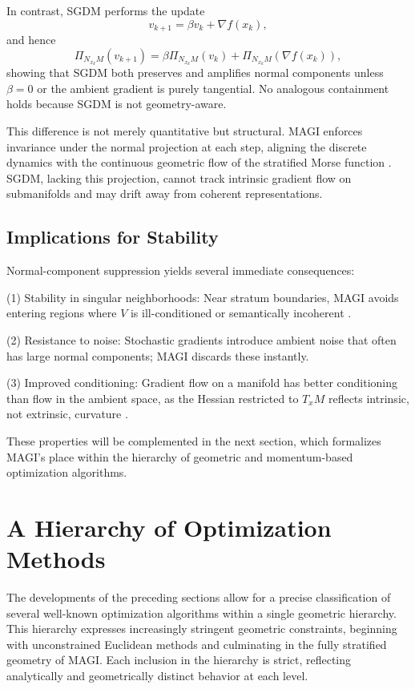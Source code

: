 \documentclass[12pt]{article}
\begin{document}
In contrast, SGDM performs the update
\[
v_{k+1}
=
\beta v_k + \nabla f(x_k),
\]
and hence
\[
\Pi_{N_{x_k}M}(v_{k+1})
=
\beta \Pi_{N_{x_k}M}(v_k)
+
\Pi_{N_{x_k}M}(\nabla f(x_k)),
\]
showing that SGDM both preserves and amplifies normal components unless $\beta=0$ or the ambient gradient is purely tangential. No analogous containment holds because SGDM is not geometry-aware.

This difference is not merely quantitative but structural. MAGI enforces invariance under the normal projection at each step, aligning the discrete dynamics with the continuous geometric flow of the stratified Morse function \citep{GoreskyMacPherson1988}. SGDM, lacking this projection, cannot track intrinsic gradient flow on submanifolds and may drift away from coherent representations.

\subsection*{Implications for Stability}

Normal-component suppression yields several immediate consequences:

(1) Stability in singular neighborhoods: Near stratum boundaries, MAGI avoids entering regions where $V$ is ill-conditioned or semantically incoherent \citep{Pflaum2000}.

(2) Resistance to noise: Stochastic gradients introduce ambient noise that often has large normal components; MAGI discards these instantly.

(3) Improved conditioning: Gradient flow on a manifold has better conditioning than flow in the ambient space, as the Hessian restricted to $T_xM$ reflects intrinsic, not extrinsic, curvature \citep{Sakai1996}.

These properties will be complemented in the next section, which formalizes MAGI’s place within the hierarchy of geometric and momentum-based optimization algorithms.

\section{A Hierarchy of Optimization Methods}

The developments of the preceding sections allow for a precise classification of several well-known optimization algorithms within a single geometric hierarchy. This hierarchy expresses increasingly stringent geometric constraints, beginning with unconstrained Euclidean methods and culminating in the fully stratified geometry of MAGI. Each inclusion in the hierarchy is strict, reflecting analytically and geometrically distinct behavior at each level.
\end{document}
